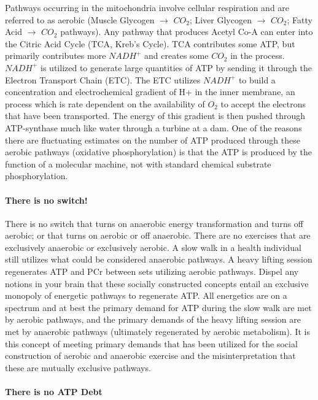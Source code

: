 Pathways occurring in the mitochondria involve cellular respiration and are referred to as aerobic (Muscle Glycogen $\rightarrow$ $CO_2$; Liver Glycogen $\rightarrow$ $CO_2$; Fatty Acid $\rightarrow$ $CO_2$ pathways). Any pathway that produces Acetyl Co-A can enter into the Citric Acid Cycle (TCA, Kreb's Cycle). TCA contributes some ATP, but primarily contributes more $NADH^+$ and creates some $CO_2$ in the process. $NADH^+$ is utilized to generate large quantities of ATP by sending it through the Electron Transport Chain (ETC). The ETC utilizes $NADH^+$ to build a concentration and electrochemical gradient of H+ in the inner membrane, an process which is rate dependent on the availability of $O_2$ to accept the electrons that have been transported. The energy of this gradient is then pushed through ATP-synthase much like water through a turbine at a dam. One of the reasons there are fluctuating estimates on the number of ATP produced through these aerobic pathways (oxidative phosphorylation) is that the ATP is produced by the function of a molecular machine, not with standard chemical substrate phosphorylation. 


\paragraph{There is no switch!}
There is no switch that turns on anaerobic energy transformation and turns off aerobic; or that turns on aerobic or off anaerobic. There are no exercises that are exclusively anaerobic or exclusively aerobic. A slow walk in a health individual still utilizes what could be considered anaerobic pathways. A heavy lifting session regenerates ATP and PCr between sets utilizing aerobic pathways. Dispel any notions in your brain that these socially constructed concepts entail an exclusive monopoly of energetic pathways to regenerate ATP. All energetics are on a spectrum and at best the primary demand for ATP during the slow walk are met by aerobic pathways, and the primary demands of the heavy lifting session are met by anaerobic pathways (ultimately regenerated by aerobic metabolism). It is this concept of meeting primary demands that has been utilized for the social construction of aerobic and anaerobic exercise and the misinterpretation that these are mutually exclusive pathways.

\paragraph{There is no ATP Debt}

